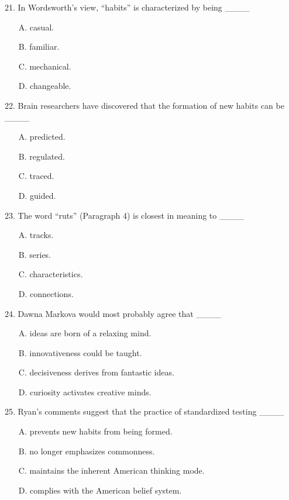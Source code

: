 \documentclass[UTF8,11pt]{ctexart}
\begin{document}
21. In Wordsworth’s view, “habits” is characterized by being \_\_\_\_


\begin{itemize}[leftmargin=2em,itemsep=.2em,topsep=.4em]\item[A.] casual.
\item[B.] familiar.
\item[C.] mechanical.
\item[D.] changeable.
\end{itemize}

22. Brain researchers have discovered that the formation of new habits can be \_\_\_\_


\begin{itemize}[leftmargin=2em,itemsep=.2em,topsep=.4em]\item[A.] predicted.
\item[B.] regulated.
\item[C.] traced.
\item[D.] guided.
\end{itemize}

23. The word “ruts” (Paragraph 4) is closest in meaning to \_\_\_\_


\begin{itemize}[leftmargin=2em,itemsep=.2em,topsep=.4em]\item[A.] tracks.
\item[B.] series.
\item[C.] characteristics.
\item[D.] connections.
\end{itemize}

24. Dawna Markova would most probably agree that \_\_\_\_


\begin{itemize}[leftmargin=2em,itemsep=.2em,topsep=.4em]\item[A.] ideas are born of a relaxing mind.
\item[B.] innovativeness could be taught.
\item[C.] decisiveness derives from fantastic ideas.
\item[D.] curiosity activates creative minds.
\end{itemize}

25. Ryan’s comments suggest that the practice of standardized testing \_\_\_\_


\begin{itemize}[leftmargin=2em,itemsep=.2em,topsep=.4em]\item[A.] prevents new habits from being formed.
\item[B.] no longer emphasizes commonness.
\item[C.] maintains the inherent American thinking mode.
\item[D.] complies with the American belief system.
\end{itemize}
\end{document}
